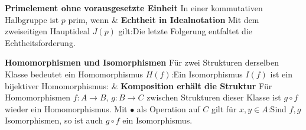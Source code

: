 \begin{BandUebersicht}
\textbf{Primelement ohne vorausgesetzte Einheit}
In einer kommutativen Halbgruppe ist \(p\) prim, wenn
&
\textbf{Echtheit in Idealnotation}
Mit dem zweiseitigen Hauptideal \(J(p)\) gilt:Die letzte Folgerung entfaltet die Echtheitsforderung.
 \\
\addlinespace[.8ex]

\textbf{Homomorphismen und Isomorphismen}
Für zwei Strukturen derselben Klasse bedeutet ein Homomorphismus
\(H(f)\):Ein Isomorphismus \(I(f)\) ist ein bijektiver Homomorphismus:
&
\textbf{Komposition erhält die Struktur}
Für Homomorphismen \(f:A\to B\), \(g:B\to C\) zwischen
Strukturen dieser Klasse ist \(g\circ f\) wieder ein Homomorphismus.
Mit \(\bullet\) als Operation auf \(C\) gilt für \(x,y\in A\):Sind \(f,g\) Isomorphismen, so ist auch \(g\circ f\) ein Isomorphismus.
 \\
\addlinespace[.8ex]
\end{BandUebersicht}

